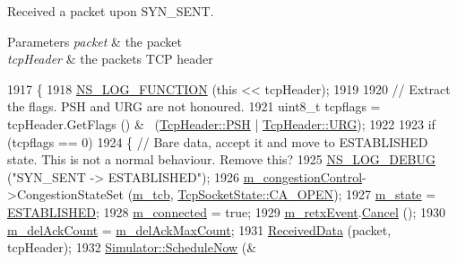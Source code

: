 Received a packet upon S\+Y\+N\+\_\+\+S\+E\+NT. 


\begin{DoxyParams}{Parameters}
{\em packet} & the packet \\
\hline
{\em tcp\+Header} & the packet\textquotesingle{}s T\+CP header \\
\hline
\end{DoxyParams}

\begin{DoxyCode}
1917 \{
1918   \hyperlink{log-macros-disabled_8h_a90b90d5bad1f39cb1b64923ea94c0761}{NS\_LOG\_FUNCTION} (\textcolor{keyword}{this} << tcpHeader);
1919 
1920   \textcolor{comment}{// Extract the flags. PSH and URG are not honoured.}
1921   uint8\_t tcpflags = tcpHeader.GetFlags () & ~(\hyperlink{classns3_1_1TcpHeader_a5f3d432941327854b5ad621e467479c6a3f1e9f1fc7466d436279cfe7ab9ef3db}{TcpHeader::PSH} | 
      \hyperlink{classns3_1_1TcpHeader_a5f3d432941327854b5ad621e467479c6a03d58c80bf87169baf9f2f4896b7cf65}{TcpHeader::URG});
1922 
1923   \textcolor{keywordflow}{if} (tcpflags == 0)
1924     \{ \textcolor{comment}{// Bare data, accept it and move to ESTABLISHED state. This is not a normal behaviour. Remove this?}
1925       \hyperlink{group__logging_ga413f1886406d49f59a6a0a89b77b4d0a}{NS\_LOG\_DEBUG} (\textcolor{stringliteral}{"SYN\_SENT -> ESTABLISHED"});
1926       \hyperlink{classns3_1_1TcpSocketBase_a090719d52b06a791341e2fefa5e12c3e}{m\_congestionControl}->CongestionStateSet (\hyperlink{classns3_1_1TcpSocketBase_a26bbaf59001308dc43fb630d76f2e38b}{m\_tcb}, 
      \hyperlink{classns3_1_1TcpSocketState_a6fc313945a33d48fd60cbffe0c787b19af2d22f02a77b603394c34d4968bad142}{TcpSocketState::CA\_OPEN});
1927       \hyperlink{classns3_1_1TcpSocketBase_a5db6f29272f23546e23320c06a681f3e}{m\_state} = \hyperlink{group__tcp_gga3929cdb47bdf159657fa24054aa5ca03a1826ad465d372319d1db905886de3743}{ESTABLISHED};
1928       \hyperlink{classns3_1_1TcpSocketBase_aa52df78102ea7c1c6b432ad9486ed0c2}{m\_connected} = \textcolor{keyword}{true};
1929       \hyperlink{classns3_1_1TcpSocketBase_a620dd547e6484bc03c6b796f589b75a6}{m\_retxEvent}.\hyperlink{classns3_1_1EventId_a993ae94e48e014e1afd47edb16db7a11}{Cancel} ();
1930       \hyperlink{classns3_1_1TcpSocketBase_a7652a3f675c8d56bd5ddc868da70153e}{m\_delAckCount} = \hyperlink{classns3_1_1TcpSocketBase_a8a36367ad1e6e7e70827e4c4ba746240}{m\_delAckMaxCount};
1931       \hyperlink{classns3_1_1TcpSocketBase_a479e1a8be1ee1b169f87e57a4dc6f73c}{ReceivedData} (packet, tcpHeader);
1932       \hyperlink{classns3_1_1Simulator_a2219ee02c0647adc83d1c918c3256266}{Simulator::ScheduleNow} (&

\end{DoxyCode}
